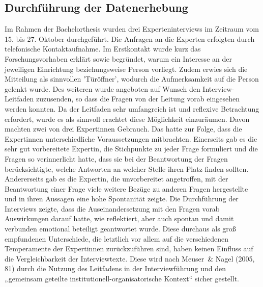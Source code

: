 \subsection{Durchführung der Datenerhebung}
Im Rahmen der Bachelorthesis wurden drei Experteninterviews im Zeitraum vom 15. bis 27. Oktober durchgeführt. 
Die Anfragen an die Experten erfolgten durch telefonische Kontaktaufnahme. Im Erstkontakt wurde kurz das Forschungsvorhaben erklärt sowie begründet, warum ein Interesse an der jeweiligen Einrichtung beziehungsweise Person vorliegt. Zudem erwies sich die Mitteilung als sinnvollen ’Türöffner’, wodurch die Aufmerksamkeit auf die Person gelenkt wurde. 
Des weiteren wurde angeboten auf Wunsch den Interview-Leitfaden zuzusenden, so dass die Fragen von der Leitung vorab eingesehen werden konnten. Da der Leitfaden sehr umfangreich ist und reflexive Betrachtung erfordert, wurde es als sinnvoll erachtet diese Möglichkeit einzuräumen. Davon machten zwei von drei Expertinnen Gebrauch. Das hatte zur Folge, dass die Expertinnen unterschiedliche Voraussetzungen mitbrachten. Einerseits gab es die sehr gut vorbereitete Expertin, die Stichpunkte zu jeder Frage formuliert und die Fragen so verinnerlicht hatte, dass sie bei der Beantwortung der Fragen berücksichtigte, welche Antworten an welcher Stelle ihren Platz finden sollten. Andererseits gab es die Expertin, die unvorbereitet angetroffen, mit der Beantwortung einer Frage viele weitere Bezüge zu anderen Fragen hergestellte und in ihren Aussagen eine hohe Spontanität zeigte. Die Durchführung der Interviews zeigte, dass die Auseinandersetzung mit den Fragen vorab Auswirkungen darauf hatte, wie reflektiert, aber auch spontan und damit verbunden emotional beteiligt geantwortet wurde.     
Diese durchaus als groß empfundenen Unterschiede, die letztlich vor allem auf die verschiedenen Temperamente der Expertinnen zurückzuführen sind, haben keinen Einfluss auf die Vergleichbarkeit der Interviewtexte. Diese wird nach Meuser~\& Nagel (2005, 81) durch die Nutzung des Leitfadens in der Interviewführung und den „gemeinsam geteilte institutionell-organisatorische Kontext“ sicher gestellt.

